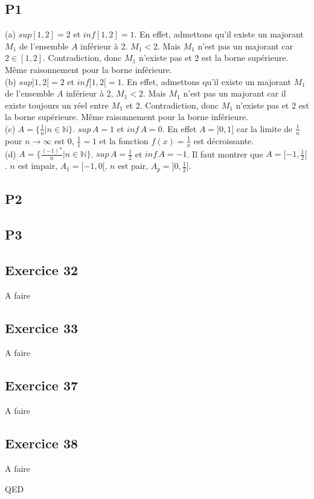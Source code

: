 \documentclass[]{book}
\theoremstyle{definition}
\newcommand{\bb}[1]{\mathbb{#1}}
\newcommand{\N}{\bb{N}}
\begin{document}
\subsection*{P1}
(a) $sup [1,2] = 2$ et $inf [1,2] = 1$. En effet, admettons qu'il existe un majorant $M_1$ de l'ensemble $A$ inf\'erieur \`a 2. $M_1 < 2$. Mais $M_1$ n'est pas un majorant car $2 \in [1,2]$. Contradiction, donc $M_1$ n'existe pas et $2$ est la borne sup\'erieure. M\^eme raisonnement pour la borne inf\'erieure. \\

(b) $sup ]1,2[ = 2$ et $inf ]1,2[ = 1$. En effet, admettons qu'il existe un majorant $M_1$ de l'ensemble $A$ inf\'erieur \`a 2, $M_1 < 2$. Mais $M_1$ n'est pas un majorant car il existe toujours un r\'eel entre $M_1$ et $2$. Contradiction, donc $M_1$ n'existe pas et $2$ est la borne sup\'erieure. M\^eme raisonnement pour la borne inf\'erieure. \\
 
(c) $A = \{\frac{1}{n}| n \in \N\}$. $sup\, A = 1$ et $inf\, A = 0$. En effet $A = ]0,1]$ car la limite de $\frac{1}{n}$ pour $n \to \infty$ est $0$, $\frac{1}{1}=1$ et la fonction $f(x)=\frac{1}{x}$ est d\'ecroissante. \\

(d) $A = \{\frac{(-1)^n}{n}| n \in \N\}$. $sup\, A = \frac{1}{2}$ et $inf\, A = -1$.  Il faut montrer que $A = [-1, \frac{1}{2}[$. $n$ est impair, $A_1 = [-1,0[$, $n$ est pair, $A_p = ]0, \frac{1}{2}]$.


\subsection*{P2}


\subsection*{P3}
 


\subsection*{Exercice 32}
A faire


\subsection*{Exercice 33}
A faire


\subsection*{Exercice 37}
A faire


\subsection*{Exercice 38}
A faire


QED
\end{document}
